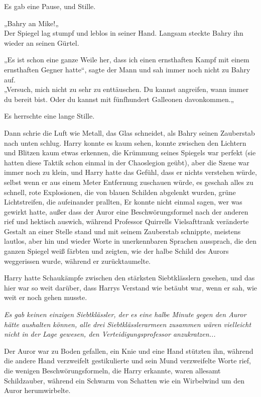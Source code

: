 {Es gab eine Pause, und Stille.

„Bahry an Mike!„\\ Der Spiegel lag stumpf und leblos in seiner Hand. Langsam steckte Bahry ihn wieder an seinen Gürtel.

„Es ist schon eine ganze Weile her, dass ich einen ernsthaften Kampf mit einem ernsthaften Gegner hatte“, sagte der Mann und sah immer noch nicht zu Bahry auf.\\ „Versuch, mich nicht zu sehr zu enttäuschen. Du kannst angreifen, wann immer du bereit bist. Oder du kannst mit fünfhundert Galleonen davonkommen.„

Es herrschte eine lange Stille.

Dann schrie die Luft wie Metall, das Glas schneidet, als Bahry seinen Zauberstab nach unten schlug. Harry konnte es kaum sehen, konnte zwischen den Lichtern und Blitzen kaum etwas erkennen, die Krümmung seines Spiegels war perfekt (sie hatten diese Taktik schon einmal in der Chaoslegion geübt), aber die Szene war immer noch zu klein, und Harry hatte das Gefühl, dass er nichts verstehen würde, selbst wenn er aus einem Meter Entfernung zuschauen würde, es geschah alles zu schnell, rote Explosionen, die von blauen Schilden abgelenkt wurden, grüne Lichtstreifen, die aufeinander prallten, Er konnte nicht einmal sagen, wer was gewirkt hatte, außer dass der Auror eine Beschwörungsformel nach der anderen rief und hektisch auswich, während Professor Quirrells Vielsafttrank veränderte Gestalt an einer Stelle stand und mit seinem Zauberstab schnippte, meistens lautlos, aber hin und wieder Worte in unerkennbaren Sprachen aussprach, die den ganzen Spiegel weiß färbten und zeigten, wie der halbe Schild des Aurors weggerissen wurde, während er zurücktaumelte.

Harry hatte Schaukämpfe zwischen den stärksten Siebtklässlern gesehen, und das hier war so weit darüber, dass Harrys Verstand wie betäubt war, wenn er sah, wie weit er noch gehen musste.

\emph{Es gab keinen einzigen Siebtklässler, der es eine halbe Minute gegen den Auror hätte aushalten können, alle drei Siebtklässlerarmeen zusammen wären vielleicht nicht in der Lage gewesen, den Verteidigungsprofessor anzukratzen...}

Der Auror war zu Boden gefallen, ein Knie und eine Hand stützten ihn, während die andere Hand verzweifelt gestikulierte und sein Mund verzweifelte Worte rief, die wenigen Beschwörungsformeln, die Harry erkannte, waren allesamt Schildzauber, während ein Schwarm von Schatten wie ein Wirbelwind um den Auror herumwirbelte.

}
